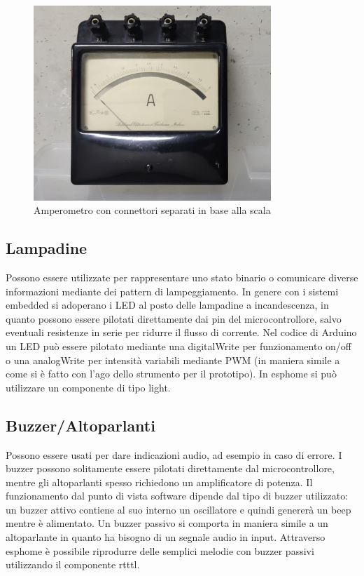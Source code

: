 \documentclass[12pt,a4paper]{report}
\begin{document}
\begin{figure}[h]
  \centering
  \includegraphics[width=0.8\textwidth]{connettorimultipli}
  \caption{Amperometro con connettori separati in base alla scala}
  \label{fig:connettorimultipli}
\end{figure}

\subsection{Lampadine}
Possono essere utilizzate per rappresentare uno stato binario o comunicare diverse informazioni mediante dei pattern di lampeggiamento.
In genere con i sistemi embedded si adoperano i LED al posto delle lampadine a incandescenza, in quanto possono essere pilotati
direttamente dai pin del microcontrollore, salvo eventuali resistenze in serie per ridurre il flusso di corrente.
Nel codice di Arduino un LED può essere pilotato mediante una digitalWrite per funzionamento on/off o una analogWrite per
intensità variabili mediante PWM (in maniera simile a come si è fatto con l'ago dello strumento per il prototipo). In esphome si può
utilizzare un componente di tipo light.

\subsection{Buzzer/Altoparlanti}
Possono essere usati per dare indicazioni audio, ad esempio in caso di errore. I buzzer possono solitamente essere pilotati direttamente
dal microcontrollore, mentre gli altoparlanti spesso richiedono un amplificatore di potenza.
Il funzionamento dal punto di vista software dipende dal tipo di buzzer utilizzato: un buzzer attivo contiene al suo interno un oscillatore
e quindi genererà un beep mentre è alimentato. Un buzzer passivo si comporta in maniera simile a un altoparlante in quanto ha bisogno di
un segnale audio in input. Attraverso esphome è possibile riprodurre delle semplici melodie con buzzer passivi utilizzando il componente rtttl.
\end{document}
